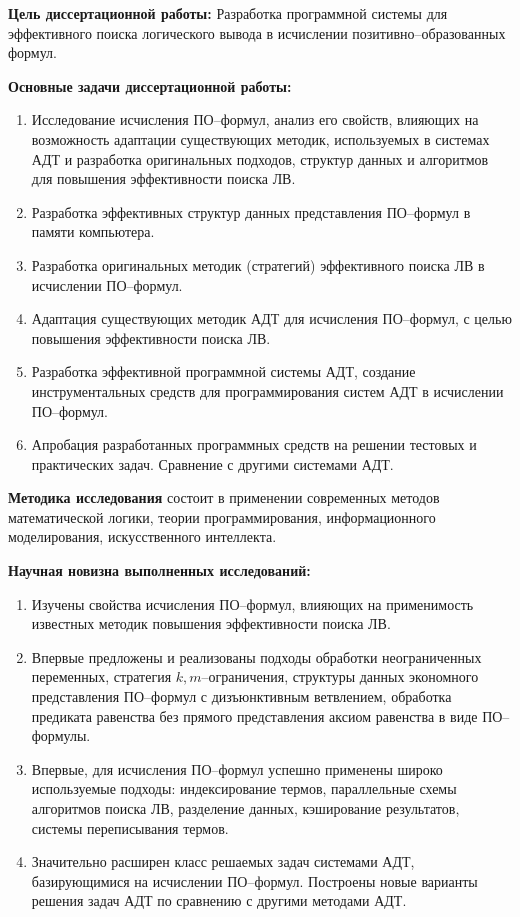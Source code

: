 \documentclass[a4paper]{report}
\begin{document}
\textbf{Цель диссертационной работы:}
Разработка программной системы для эффективного поиска логического вывода в исчислении позитивно--образованных формул.

\textbf{Основные задачи диссертационной работы:}
\begin{enumerate}
\item Исследование исчисления ПО--формул, анализ его свойств, влияющих на возможность адаптации существующих методик, используемых в системах АДТ и разработка оригинальных подходов, структур данных и алгоритмов для повышения эффективности поиска ЛВ.
\item Разработка эффективных структур данных представления ПО--формул в памяти компьютера.
\item Разработка оригинальных методик (стратегий) эффективного поиска ЛВ в исчислении ПО--формул.
\item Адаптация существующих методик АДТ для исчисления ПО--формул, с целью повышения эффективности поиска ЛВ.
\item Разработка эффективной программной системы АДТ, создание инструментальных средств для программирования систем АДТ в исчислении ПО--формул.
\item Апробация разработанных программных средств на решении тестовых и практических задач. Сравнение с другими системами АДТ.
\end{enumerate}

\textbf{Методика исследования} состоит в применении современных методов математической логики, теории программирования, информационного моделирования, искусственного интеллекта.


\textbf{Научная новизна выполненных исследований:}
\begin{enumerate}
\item Изучены свойства исчисления ПО--формул, влияющих на применимость известных методик повышения эффективности поиска ЛВ.
\item Впервые предложены и реализованы подходы обработки неограниченных переменных, стратегия $k,m$--ограничения, структуры данных экономного представления ПО--формул с дизъюнктивным ветвлением, обработка предиката равенства без прямого представления аксиом равенства в виде ПО--формулы.
\item Впервые, для исчисления ПО--формул успешно применены широко используемые подходы: индексирование термов, параллельные схемы алгоритмов поиска ЛВ, разделение данных, кэширование результатов, системы переписывания термов.
\item Значительно расширен класс решаемых задач системами АДТ, базирующимися на исчислении ПО--формул. Построены новые варианты решения задач АДТ по сравнению с другими методами АДТ.
\end{enumerate}
\end{document}
